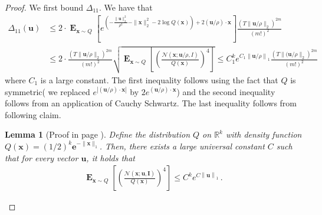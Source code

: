 \documentclass[10pt,a4paper]{article}
\newtheorem{lemma}{Lemma}[section]
\newcommand\twonorm[1]{\|#1\|_2}
\newcommand\norm[1]{\left\| #1 \right\|}
\renewcommand\vec[1]{\mathbf{#1}}
\DeclareMathOperator*{\E}{\mathbf{E}}
\newcommand{\e}{\mathbf{e}}
\newcommand{\R}{\mathbb{R}}
\newcommand{\1}{\Ind}
\newcommand{\x}{\vec x}
\newcommand{\vu}{\vec u}
\newcommand{\Gauss}{\mathcal{N}}
\begin{document}
\begin{proof}
      We first bound $\Delta_{11}$. We have that 
      \begin{align*}
        \Delta_{11}(\vu)&\leq 
            2\cdot \E_{\x\sim Q}\left[e^{\left(-\frac{\twonorm{\vu}^2}{\rho^2}-\twonorm{\x}^2-2\log Q{(\x)}\right)+{2(\vu/\rho)\cdot \x}}\right]\frac{\left(T\twonorm{\vu/\rho}\right)^{2m}}{(m!)^2}  \\
            &\leq 2\cdot\frac{\left(T\twonorm{\vu/\rho}\right)^{2m}}{(m!)^2} \sqrt{\E_{\x\sim Q}\left[\left(\frac{\Gauss(\x;\vu/\rho,I)}{Q(\x)}\right)^4\right]} 
            \leq C_1^ke^{C_1\norm{\vu/\rho}_1}\frac{\left(T\twonorm{(\vu/\rho}\right)^{2m}}{(m!)^2} 
      \end{align*}
      where $C_1$ is a large constant.
      The first inequality follows using the fact that $Q$ is symmetric( we replaced $e^{|(\vu/\rho)\cdot \x|}$ by $2e^{(\vu/\rho)\cdot \x}$) and the second inequality follows from an application of Cauchy Schwartz. The last inequality follows from following claim.
      \begin{lemma}[Proof in page \pageref{proof:ratio_subexp}]
    \label{lem:ratio_subexp}
Define the distribution $Q$ on $\R^k$ with density function $Q(\x) = (1/2)^k 
\e^{-\|\x\|_1}$.  Then, there exists a large universal constant $C$ such that for every vector $\vu$, it holds that
\begin{align*}
    \E_{\x\sim Q}\left[\left(\frac{\mathcal{N}(\x; \vu, \vec I)}{
    Q(\x)}\right)^4\right] \leq 
    C^ke^{C\norm{\vu}_1}\,.
    \end{align*} 
\end{lemma}


\end{proof}
\end{document}
